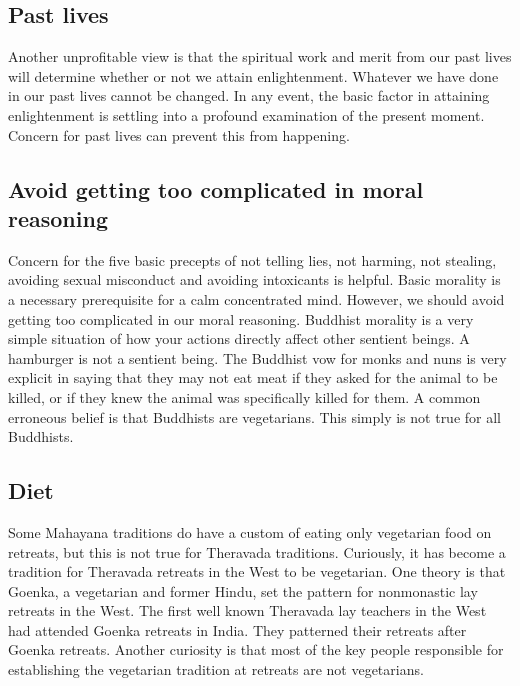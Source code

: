 \documentclass[a5paper,10pt,english]{book}
\begin{document}
\subsection{Past lives}
\label{\detokenize{saints:past-lives}}
\sphinxAtStartPar
Another unprofitable view is that the spiritual work and merit from our
past lives will determine whether or not we attain enlightenment.
Whatever we have done in our past lives cannot be changed. In any event,
the basic factor in attaining enlightenment is settling into a profound
examination of the present moment. Concern for past lives can prevent
this from happening.


\subsection{Avoid getting too complicated in moral reasoning}
\label{\detokenize{saints:avoid-getting-too-complicated-in-moral-reasoning}}
\sphinxAtStartPar
Concern for the five basic precepts of not telling lies, not harming,
not stealing, avoiding sexual misconduct and avoiding intoxicants is
helpful. Basic morality is a necessary prerequisite for a calm
concentrated mind. However, we should avoid getting too complicated in
our moral reasoning. Buddhist morality is a very simple situation of how
your actions directly affect other sentient beings. A hamburger is not a
sentient being. The Buddhist vow for monks and nuns is very explicit in
saying that they may not eat meat if they asked for the animal to be
killed, or if they knew the animal was specifically killed for them. A
common erroneous belief is that Buddhists are vegetarians. This simply
is not true for all Buddhists.


\subsection{Diet}
\label{\detokenize{saints:diet}}
\sphinxAtStartPar
Some Mahayana traditions do have a custom of eating only vegetarian food
on retreats, but this is not true for Theravada traditions. Curiously,
it has become a tradition for Theravada retreats in the West to be
vegetarian. One theory is that Goenka, a vegetarian and former Hindu,
set the pattern for non\sphinxhyphen{}monastic lay retreats in the West. The first
well known Theravada lay teachers in the West had attended Goenka
retreats in India. They patterned their retreats after Goenka retreats.
Another curiosity is that most of the key people responsible for
establishing the vegetarian tradition at  retreats are not
vegetarians.
\end{document}
